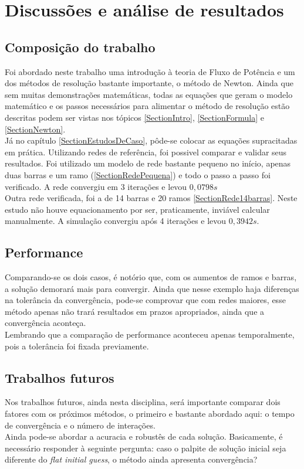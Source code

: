 \chapter{Discussões e an\'alise de resultados}
\section{Composição do trabalho}
Foi abordado neste trabalho uma introdução à teoria de Fluxo de Potência e um dos métodos de resolução bastante importante, o método de Newton. Ainda que sem muitas demonstrações matemáticas, todas as equações que geram o modelo matemático e os passos necessários para alimentar o método de resolução estão descritas podem ser vistas nos tópicos \ref{SectionIntro}, \ref{SectionFormula} e \ref{SectionNewton}.\\
Já no capítulo \ref{SectionEstudosDeCaso}, pôde-se colocar as equações supracitadas em prática. Utilizando redes de referência, foi possivel comparar e validar seus resultados. Foi utilizado um modelo de rede bastante pequeno no início, apenas duas barras e um ramo (\ref{SectionRedePequena}) e todo o passo a passo foi verificado. A rede convergiu em 3 iterações e levou $0,0798s$\\
Outra rede verificada, foi a de 14 barras e 20 ramos \ref{SectionRede14barras}. Neste estudo não houve equacionamento por ser, praticamente, inviável calcular manualmente. A simulação convergiu após 4 iterações e levou $0,3942s$.\\
\section{Performance}
Comparando-se os dois casos, é notório que, com os aumentos de ramos e barras, a solução demorará mais para convergir. Ainda que nesse exemplo haja diferenças na tolerância da convergência, pode-se comprovar que com redes maiores, esse método apenas não trará resultados em prazos apropriados, ainda que a convergência aconteça.\\
Lembrando que a comparação de performance aconteceu apenas temporalmente, pois a tolerância foi fixada previamente.
\section{Trabalhos futuros}
Nos trabalhos futuros, ainda nesta disciplina, será importante comparar dois fatores com os próximos métodos, o primeiro e bastante abordado aqui: o tempo de convergência e o número de interações.\\
Ainda pode-se abordar a acuracia e robustês de cada solução. Basicamente, é necessário responder à seguinte pergunta: caso o palpite de solução inicial seja diferente do \textit{flat initial guess}, o método ainda apresenta convergência? 





